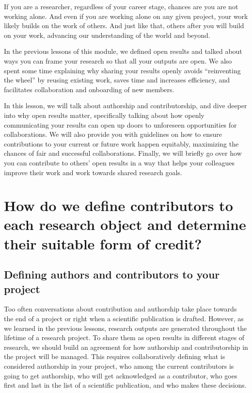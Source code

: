 \documentclass[
  letterpaper,
  DIV=11,
  numbers=noendperiod]{scrreport}
\begin{document}
If you are a researcher, regardless of your career stage, chances are
you are not working alone. And even if you are working alone on any
given project, your work likely builds on the work of others. And just
like that, others after you will build on your work, advancing our
understanding of the world and beyond.

In the previous lessons of this module, we defined open results and
talked about ways you can frame your research so that all your outputs
are open. We also spent some time explaining why sharing your results
openly avoids ``reinventing the wheel'' by reusing existing work, saves
time and increases efficiency, and facilitates collaboration and
onboarding of new members.

In this lesson, we will talk about authorship and contributorship, and
dive deeper into why open results matter, specifically talking about how
openly communicating your results can open up doors to unforeseen
opportunities for collaborations. We will also provide you with
guidelines on how to ensure contributions to your current or future work
happen equitably, maximizing the chances of fair and successful
collaborations. Finally, we will briefly go over how you can contribute
to others' open results in a way that helps your colleagues improve
their work and work towards shared research goals.

\hypertarget{how-do-we-define-contributors-to-each-research-object-and-determine-their-suitable-form-of-credit}{%
\section{How do we define contributors to each research object and
determine their suitable form of
credit?}\label{how-do-we-define-contributors-to-each-research-object-and-determine-their-suitable-form-of-credit}}

\hypertarget{defining-authors-and-contributors-to-your-project}{%
\subsection{Defining authors and contributors to your
project}\label{defining-authors-and-contributors-to-your-project}}

Too often conversations about contribution and authorship take place
towards the end of a project or right when a scientific publication is
drafted. However, as we learned in the previous lessons, research
outputs are generated throughout the lifetime of a research project. To
share them as open results in different stages of research, we should
build an agreement for how authorship and contributorship in the project
will be managed. This requires collaboratively defining what is
considered authorship in your project, who among the current
contributors is going to get authorship, who will get acknowledged as a
contributor, who goes first and last in the list of a scientific
publication, and who makes these decisions.
\end{document}
